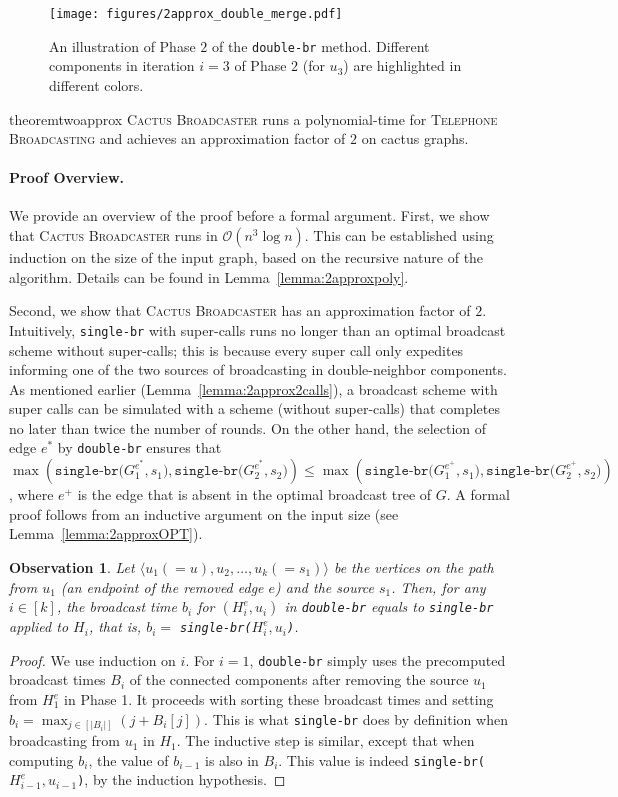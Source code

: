 \documentclass[letterpaper,11pt]{article}
\newtheorem{observation}{Observation}[section]
\newcommand{\oh}{\mathcal{O}}
\newcommand{\telebr}{\textsc{Telephone Broadcasting}\xspace}
\newcommand{\singlefunc}[1]{\texttt{single-br(#1)}\xspace}
\newcommand{\singlefuncc}{\texttt{single-br}\xspace}
\newcommand{\doublefuncc}{\texttt{double-br}\xspace}
\newcommand{\ouralgo}{\textsc{Cactus Broadcaster}\xspace}
\newcommand{\twoapproxnewfig}{

\begin{figure}
	\centering
	\texttt{[image: figures/2approx\_double\_merge.pdf]}
	\caption{An illustration of Phase $2$ of the \doublefuncc method. Different components in iteration $i=3$ of Phase $2$ (for $u_3$) are highlighted in different colors. 
}
    \label{fig:2approxDoubleMerge}
\end{figure}
}
\begin{document}
\twoapproxnewfig



\begin{restatable}{theorem}{twoapprox} \label{thm:2approx}
    \ouralgo runs a polynomial-time for \telebr and achieves an approximation factor of $2$ on cactus graphs.
\end{restatable}

\paragraph{Proof Overview.}
We provide an overview of the proof before a formal argument.
First, we show that \ouralgo runs in $\oh(n^3 \log n)$. This can be established using induction on the size of the input graph, based on the recursive nature of the algorithm. Details can be found in Lemma~\ref{lemma:2approxpoly}.

Second, we show that \ouralgo has an approximation factor of $2$. Intuitively, \singlefuncc with super-calls runs no longer than an optimal broadcast scheme without super-calls; this is because every super call only expedites informing one of the two sources of broadcasting in double-neighbor components. As mentioned earlier (Lemma~\ref{lemma:2approx2calls}), a broadcast scheme with super calls can be simulated with a scheme (without super-calls) that completes no later than twice the number of rounds. 
On the other hand, the selection of edge $e^*$ by \doublefuncc ensures that 
$
    \max (\singlefunc{$G^{e^*}_1, s_1$}, \singlefunc{$G^{e^*}_2, s_2$}) \leq \max (\singlefunc{$G^{e^+}_1, s_1$}, \singlefunc{$G^{e^+}_2, s_2$})
$, 
where $e^+$ is the edge that is absent in the optimal broadcast tree of $G$. 
A formal proof follows from an inductive argument on the input size (see Lemma~\ref{lemma:2approxOPT}).

\begin{observation}\label{obs:doublefunc}
Let $\langle u_1 (=u), u_2,\ldots, u_k (=s_1) \rangle$ be the vertices on the path from $u_1$ (an endpoint of the removed edge $e$) and the source $s_1$. Then, for any $i\in [k]$, the broadcast time $b_i$ for $(H^e_i,u_i)$ in \doublefuncc equals to \singlefuncc applied to $H_i$, that is, $b_i = $ \singlefunc{$H^e_i, u_i$}.
\end{observation}
\begin{proof}
    We use induction on $i$. For $i=1$, \doublefuncc simply uses the precomputed broadcast times $B_i$ of the connected components after removing the source $u_1$ from $H_1^e$ in Phase 1. It proceeds with sorting these broadcast times and setting $b_i = \max_{j\in[|B_i|]} (j+B_i[j])$. This is what \singlefuncc does by definition when broadcasting from $u_1$ in $H_1$. The inductive step is similar, except that when computing $b_i$, the value of $b_{i-1}$ is also in $B_i$. This value is indeed \singlefunc{$H^e_{i-1},u_{i-1}$}, by the induction hypothesis. 
\end{proof}
\end{document}
